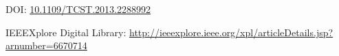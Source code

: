 \documentclass[a4paper,12pt]{article}
\newcommand{\doi}[1]{DOI: \href{http://dx.doi.org/#1}{#1}}
\begin{document}
\thispagestyle{empty}

\vspace{3cm}

\nocite{FDB-art-25}
\printbibliography

\vspace{3cm}
\doi{10.1109/TCST.2013.2288992}

\vspace{1.5cm}
IEEEXplore Digital Library:
\url{http://ieeexplore.ieee.org/xpl/articleDetails.jsp?arnumber=6670714}

\newpage

\end{document}
